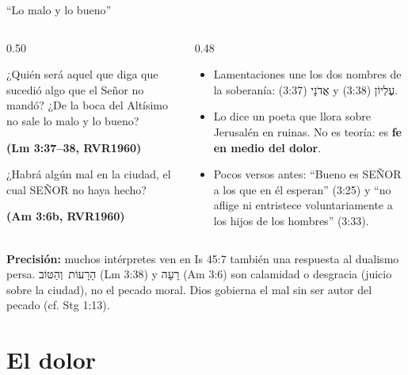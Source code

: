 \documentclass[hyperref={bookmarks=false},aspectratio=169]{beamer}
\newcommand{\heb}[1]{\mbox{\foreignlanguage{hebrew}{#1}}}
\newcommand{\SENOR}{S{\fontsize{0.78em}{1em}\selectfont EÑOR}}
\newcommand{\fuente}[1]{\par\hfill{\upshape\bfseries\footnotesize\textcolor{azul}{#1}}}
\newcommand{\destacar}[1]{\textbf{\textcolor{azul}{#1}}}
\newcommand{\precision}[1]{{\footnotesize\color{gris}\textbf{Precisión:} #1}}
\begin{document}
\begin{frame}{``Lo malo y lo bueno''}
\begin{columns}[t,onlytextwidth]
\begin{column}{0.50\textwidth}
\begin{cita}¿Quién será aquel que diga que sucedió algo que el Señor no mandó? ¿De la boca del Altísimo no sale lo malo y lo bueno?\fuente{(Lm 3:37--38, RVR1960)}\end{cita}
\begin{cita}¿Habrá algún mal en la ciudad, el cual \SENOR{} no haya hecho?\fuente{(Am 3:6b, RVR1960)}\end{cita}
\end{column}
\begin{column}{0.48\textwidth}\small
\begin{itemize}
\item Lamentaciones une los dos nombres de la soberanía: \heb{אֲדֹנָי} (3:37) y \heb{עֶלְיוֹן} (3:38).
\item Lo dice un poeta que llora sobre Jerusalén en ruinas. No es teoría: es \destacar{fe en medio del dolor}.
\item Pocos versos antes: ``Bueno es \SENOR{} a los que en él esperan'' (3:25) y ``no aflige ni entristece voluntariamente a los hijos de los hombres'' (3:33).
\end{itemize}
\end{column}
\end{columns}\par\smallskip
\precision{muchos intérpretes ven en Is 45:7 también una respuesta al dualismo persa. \heb{הָרָעוֹת וְהַטּוֹב} (Lm 3:38) y \heb{רָעָה} (Am 3:6) son calamidad o desgracia (juicio sobre la ciudad), no el pecado moral. Dios gobierna el mal sin ser autor del pecado (cf. Stg 1:13).}
\end{frame}

\section{El dolor}
\end{document}
